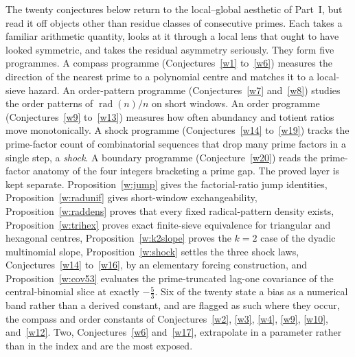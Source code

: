 \documentclass[11pt]{article}
\theoremstyle{definition}
\begin{document}
The twenty conjectures below return to the local--global aesthetic of Part~I, but read it off objects other than residue classes of consecutive primes.  Each takes a familiar arithmetic quantity, looks at it through a local lens that ought to have looked symmetric, and takes the residual asymmetry seriously.  They form five programmes.  A compass programme (Conjectures~\ref{w1} to~\ref{w6}) measures the direction of the nearest prime to a polynomial centre and matches it to a local-sieve hazard.  An order-pattern programme (Conjectures~\ref{w7} and~\ref{w8}) studies the order patterns of $\operatorname{rad}(n)/n$ on short windows.  An order programme (Conjectures~\ref{w9} to~\ref{w13}) measures how often abundancy and totient ratios move monotonically.  A shock programme (Conjectures~\ref{w14} to~\ref{w19}) tracks the prime-factor count of combinatorial sequences that drop many prime factors in a single step, a \emph{shock}.  A boundary programme (Conjecture~\ref{w20}) reads the prime-factor anatomy of the four integers bracketing a prime gap.  The proved layer is kept separate.  Proposition~\ref{w:jump} gives the factorial-ratio jump identities, Proposition~\ref{w:radunif} gives short-window exchangeability, Proposition~\ref{w:raddens} proves that every fixed radical-pattern density exists, Proposition~\ref{w:trihex} proves exact finite-sieve equivalence for triangular and hexagonal centres, Proposition~\ref{w:k2slope} proves the $k=2$ case of the dyadic multinomial slope, Proposition~\ref{w:shock} settles the three shock laws, Conjectures~\ref{w14} to~\ref{w16}, by an elementary forcing construction, and Proposition~\ref{w:cov53} evaluates the prime-truncated lag-one covariance of the central-binomial slice at exactly $-\tfrac53$.  Six of the twenty state a bias as a numerical band rather than a derived constant, and are flagged as such where they occur, the compass and order constants of Conjectures~\ref{w2}, \ref{w3}, \ref{w4}, \ref{w9}, \ref{w10}, and~\ref{w12}.  Two, Conjectures~\ref{w6} and~\ref{w17}, extrapolate in a parameter rather than in the index and are the most exposed.
\end{document}
